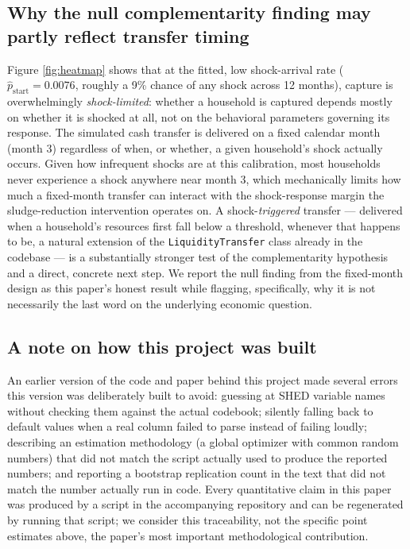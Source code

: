 \documentclass[12pt]{article}
\begin{document}
\subsection{Why the null complementarity finding may partly reflect transfer timing}

Figure \ref{fig:heatmap} shows that at the fitted, low shock-arrival rate ($\hat p_{\text{start}}=0.0076$, roughly a 9\% chance of any shock across 12 months), capture is overwhelmingly \emph{shock-limited}: whether a household is captured depends mostly on whether it is shocked at all, not on the behavioral parameters governing its response. The simulated cash transfer is delivered on a fixed calendar month (month 3) regardless of when, or whether, a given household's shock actually occurs. Given how infrequent shocks are at this calibration, most households never experience a shock anywhere near month 3, which mechanically limits how much a fixed-month transfer can interact with the shock-response margin the sludge-reduction intervention operates on. A shock-\emph{triggered} transfer — delivered when a household's resources first fall below a threshold, whenever that happens to be, a natural extension of the \texttt{LiquidityTransfer} class already in the codebase — is a substantially stronger test of the complementarity hypothesis and a direct, concrete next step. We report the null finding from the fixed-month design as this paper's honest result while flagging, specifically, why it is not necessarily the last word on the underlying economic question.

\subsection{A note on how this project was built}

An earlier version of the code and paper behind this project made several errors this version was deliberately built to avoid: guessing at SHED variable names without checking them against the actual codebook; silently falling back to default values when a real column failed to parse instead of failing loudly; describing an estimation methodology (a global optimizer with common random numbers) that did not match the script actually used to produce the reported numbers; and reporting a bootstrap replication count in the text that did not match the number actually run in code. Every quantitative claim in this paper was produced by a script in the accompanying repository and can be regenerated by running that script; we consider this traceability, not the specific point estimates above, the paper's most important methodological contribution.
\end{document}
